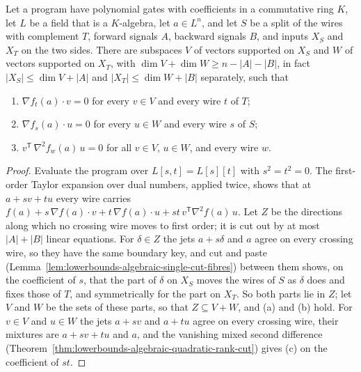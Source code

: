 \begin{theorem}
  \label{thm:lowerbounds-algebraic-taylor-cut}
  \leanok
  Let a program have polynomial gates with coefficients in a commutative
  ring $K$, let $L$ be a field that is a $K$-algebra, let $a\in L^n$, and let
  $S$ be a split of the wires with complement $T$, forward signals $A$,
  backward signals $B$, and inputs $X_S$ and $X_T$ on the two sides. There
  are subspaces $V$ of vectors supported on $X_S$ and $W$ of vectors
  supported on $X_T$, with $\dim V+\dim W\ge n-|A|-|B|$, in fact
  $|X_S|\le\dim V+|A|$ and $|X_T|\le\dim W+|B|$ separately, such that
  \begin{enumerate}
    \item[(a)] $\nabla f_t(a)\cdot v=0$ for every $v\in V$ and every wire $t$ of $T$;
    \item[(b)] $\nabla f_s(a)\cdot u=0$ for every $u\in W$ and every wire $s$ of $S$;
    \item[(c)] $v^{\mathsf T}\,\nabla^2 f_w(a)\,u=0$ for all $v\in V$, $u\in W$, and
      every wire $w$.
  \end{enumerate}
\end{theorem}
\begin{proof}
  \leanok
  Evaluate the program over $L[s,t]=L[s][t]$ with $s^2=t^2=0$. The
  first-order Taylor expansion over dual numbers, applied twice, shows that
  at $a+sv+tu$ every wire carries
  $f(a)+s\,\nabla f(a)\cdot v+t\,\nabla f(a)\cdot u+st\,v^{\mathsf T}\nabla^2
  f(a)\,u$. Let $Z$ be the directions along which no crossing wire moves to
  first order; it is cut out by at most $|A|+|B|$ linear equations. For
  $\delta\in Z$ the jets $a+s\delta$ and $a$ agree on every crossing wire,
  so they have the same boundary key, and cut and paste
  (Lemma~\ref{lem:lowerbounds-algebraic-single-cut-fibres}) between them
  shows, on the coefficient of $s$, that the part of $\delta$ on $X_S$ moves
  the wires of $S$ as $\delta$ does and fixes those of $T$, and symmetrically
  for the part on $X_T$. So both parts lie in $Z$; let $V$ and $W$ be the
  sets of these parts, so that $Z\subseteq V+W$, and (a) and (b) hold. For
  $v\in V$ and $u\in W$ the jets $a+sv$ and $a+tu$ agree on every crossing
  wire, their mixtures are $a+sv+tu$ and $a$, and the vanishing mixed second
  difference
  (Theorem~\ref{thm:lowerbounds-algebraic-quadratic-rank-cut}) gives (c) on
  the coefficient of $st$.
\end{proof}

